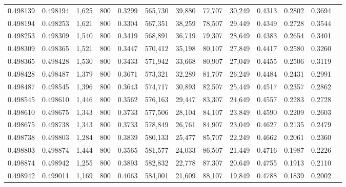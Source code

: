 \begin{tabular}{rrrrrrrrrrrrr}
0.498139 & 0.498194 &  1,625 &   800 &                                     0.3299 & 565,730 &  39,880 &  77,707 &  30,249 & 0.4313 & 0.2802 & 0.3694 \\
0.498194 & 0.498253 &  1,621 &   800 &                                     0.3304 & 567,351 &  38,259 &  78,507 &  29,449 & 0.4349 & 0.2728 & 0.3544 \\
0.498253 & 0.498309 &  1,540 &   800 &                                     0.3419 & 568,891 &  36,719 &  79,307 &  28,649 & 0.4383 & 0.2654 & 0.3401 \\
0.498309 & 0.498365 &  1,521 &   800 &                                     0.3447 & 570,412 &  35,198 &  80,107 &  27,849 & 0.4417 & 0.2580 & 0.3260 \\
0.498365 & 0.498428 &  1,530 &   800 &                                     0.3433 & 571,942 &  33,668 &  80,907 &  27,049 & 0.4455 & 0.2506 & 0.3119 \\
0.498428 & 0.498487 &  1,379 &   800 &                                     0.3671 & 573,321 &  32,289 &  81,707 &  26,249 & 0.4484 & 0.2431 & 0.2991 \\
0.498487 & 0.498545 &  1,396 &   800 &                                     0.3643 & 574,717 &  30,893 &  82,507 &  25,449 & 0.4517 & 0.2357 & 0.2862 \\
0.498545 & 0.498610 &  1,446 &   800 &                                     0.3562 & 576,163 &  29,447 &  83,307 &  24,649 & 0.4557 & 0.2283 & 0.2728 \\
0.498610 & 0.498675 &  1,343 &   800 &                                     0.3733 & 577,506 &  28,104 &  84,107 &  23,849 & 0.4590 & 0.2209 & 0.2603 \\
0.498675 & 0.498738 &  1,343 &   800 &                                     0.3733 & 578,849 &  26,761 &  84,907 &  23,049 & 0.4627 & 0.2135 & 0.2479 \\
0.498738 & 0.498803 &  1,284 &   800 &                                     0.3839 & 580,133 &  25,477 &  85,707 &  22,249 & 0.4662 & 0.2061 & 0.2360 \\
0.498803 & 0.498874 &  1,444 &   800 &                                     0.3565 & 581,577 &  24,033 &  86,507 &  21,449 & 0.4716 & 0.1987 & 0.2226 \\
0.498874 & 0.498942 &  1,255 &   800 &                                     0.3893 & 582,832 &  22,778 &  87,307 &  20,649 & 0.4755 & 0.1913 & 0.2110 \\
0.498942 & 0.499011 &  1,169 &   800 &                                     0.4063 & 584,001 &  21,609 &  88,107 &  19,849 & 0.4788 & 0.1839 & 0.2002 \\

\end{tabular}
